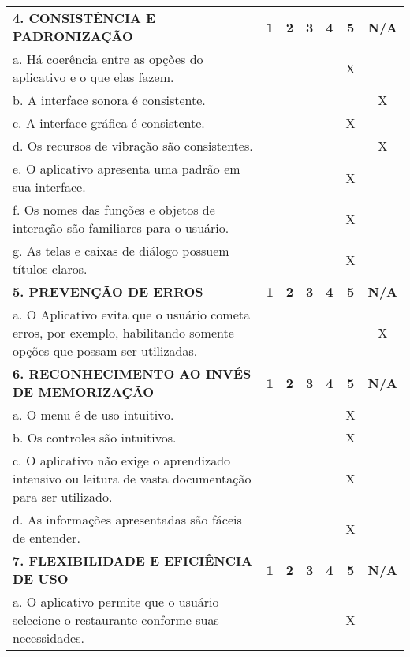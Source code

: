 \documentclass[portuguese,oneside]{tcc}
\begin{document}
\begin{center}
\begin{longtabu}{|L{25em}|c|c|c|c|c|c|}
												\textbf{4. CONSISTÊNCIA E PADRONIZAÇÃO} & \textbf{1} & \textbf{2} & \textbf{3} & \textbf{4} & \textbf{5} & \textbf{N/A} \\ 
												a. Há coerência entre as opções do aplicativo e o que elas fazem. & & & & & X & \\ 
												b. A interface sonora é consistente. & & & & & & X \\ 
												c. A interface gráfica é consistente. & & & & & X & \\ 
												d. Os recursos de vibração são consistentes. & & & & & & X \\ 
												e. O aplicativo apresenta uma padrão em sua interface. & & & & & X & \\ 
												f. Os nomes das funções e objetos de interação são familiares para o usuário. & & & & & X & \\ 
												g. As telas e caixas de diálogo possuem títulos claros. & & & & & X & \\ 
												\textbf{5. PREVENÇÃO DE ERROS} & \textbf{1} & \textbf{2} & \textbf{3} & \textbf{4} & \textbf{5} & \textbf{N/A} \\ 
												a. O Aplicativo evita que o usuário cometa erros, por exemplo, habilitando somente opções que possam ser utilizadas. & & & & & & X \\ 
												\textbf{6. RECONHECIMENTO AO INVÉS DE MEMORIZAÇÃO} & \textbf{1} & \textbf{2} & \textbf{3} & \textbf{4} & \textbf{5} & \textbf{N/A} \\ 
												a. O  menu é de uso intuitivo. & & & & & X & \\ 
												b. Os controles são intuitivos. & & & & & X & \\ 
												c. O aplicativo não exige o aprendizado intensivo ou leitura de vasta documentação para ser utilizado. & & & & & X & \\ 
												d. As informações apresentadas são fáceis de entender. & & & & & X & \\ 
												\textbf{7. FLEXIBILIDADE E EFICIÊNCIA DE USO} & \textbf{1} & \textbf{2} & \textbf{3} & \textbf{4} & \textbf{5} & \textbf{N/A} \\ 
												a. O aplicativo permite que o usuário selecione o restaurante conforme suas necessidades. & & & & & X & \\ 

\end{longtabu}
\end{center}
\end{document}
